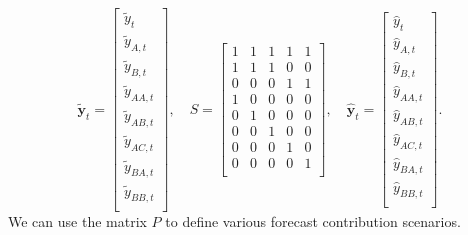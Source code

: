 \documentclass{article}
\begin{document}
  \begin{equation}
    \tilde{\textbf{y}}_{t} = 
    \begin{bmatrix}
      \tilde{y}_{t} \\
      \tilde{y}_{A, t} \\
      \tilde{y}_{B, t} \\
      \tilde{y}_{AA, t} \\
      \tilde{y}_{AB, t} \\
      \tilde{y}_{AC, t} \\
      \tilde{y}_{BA, t} \\
      \tilde{y}_{BB, t} \\
    \end{bmatrix}, \quad
    S = 
    \begin{bmatrix}
      1 &1 &1 &1 &1 \\
      1 &1 &1 &0 &0 \\
      0 &0 &0 &1 &1 \\
      1 &0 &0 &0 &0 \\
      0 &1 &0 &0 &0 \\
      0 &0 &1 &0 &0 \\
      0 &0 &0 &1 &0 \\
      0 &0 &0 &0 &1 \\
    \end{bmatrix}, \quad
    \hat{\textbf{y}}_{t} = 
    \begin{bmatrix}
      \hat{y}_{t} \\
      \hat{y}_{A, t} \\
      \hat{y}_{B, t} \\
      \hat{y}_{AA, t} \\
      \hat{y}_{AB, t} \\
      \hat{y}_{AC, t} \\
      \hat{y}_{BA, t} \\
      \hat{y}_{BB, t} \\
    \end{bmatrix}.  
  \end{equation}
  We can use the matrix \(P\) to define various forecast contribution scenarios. 
  
\end{document}
